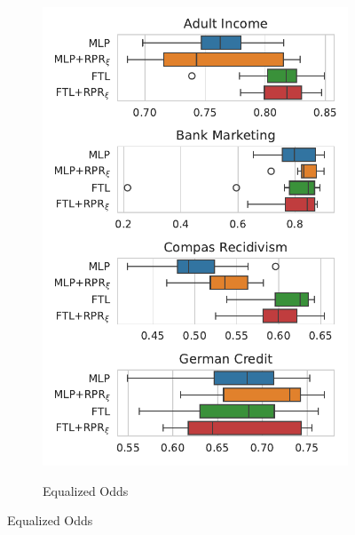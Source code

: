 \begin{figure}[!ht]
\begin{subfigure}{.32\linewidth}
    \includegraphics[width=1\linewidth]{images/boxplot_acc_opportunity_rpr.pdf}
\end{subfigure}
\begin{subfigure}{.32\linewidth}
    \caption{Equalized Odds}
    \label{fig:boxplot_acc_odds_rpr}

\end{subfigure}
\end{figure}
